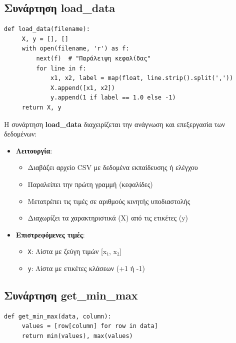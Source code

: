 \documentclass[12pt,a4paper,twoside]{book}
\begin{document}
\subsection{Συνάρτηση load\_data}

\begin{tcolorbox}[myCustomStyle = {perceptron.py}]
    \begin{lstlisting}[style=myPythonStyle]
 def load_data(filename):
     X, y = [], []
     with open(filename, 'r') as f:
         next(f)  # "Παράλειψη κεφαλίδας"
         for line in f:
             x1, x2, label = map(float, line.strip().split(','))
             X.append([x1, x2])
             y.append(1 if label == 1.0 else -1)
     return X, y
    \end{lstlisting}
\end{tcolorbox}

Η συνάρτηση \textbf{load\_data} διαχειρίζεται την ανάγνωση και επεξεργασία των δεδομένων:
\begin{itemize}
    \item \textbf{Λειτουργία}:
    \begin{itemize}
        \item Διαβάζει αρχείο CSV με δεδομένα εκπαίδευσης ή ελέγχου
        \item Παραλείπει την πρώτη γραμμή (κεφαλίδες)
        \item Μετατρέπει τις τιμές σε αριθμούς κινητής υποδιαστολής
        \item Διαχωρίζει τα χαρακτηριστικά (X) από τις ετικέτες (y)
    \end{itemize}
    \item \textbf{Επιστρεφόμενες τιμές}:
    \begin{itemize}
        \item \texttt{X}: Λίστα με ζεύγη τιμών [x₁, x₂]
        \item \texttt{y}: Λίστα με ετικέτες κλάσεων (+1 ή -1)
    \end{itemize}
\end{itemize}

\subsection{Συνάρτηση get\_min\_max}

\begin{tcolorbox}[myCustomStyle = {perceptron.py}]
    \begin{lstlisting}[style=myPythonStyle]
 def get_min_max(data, column):
     values = [row[column] for row in data]
     return min(values), max(values)
    \end{lstlisting}
\end{tcolorbox}
\end{document}
